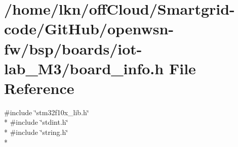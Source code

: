 \hypertarget{iot-lab___m3_2board__info_8h}{}\section{/home/lkn/off\+Cloud/\+Smartgrid-\/code/\+Git\+Hub/openwsn-\/fw/bsp/boards/iot-\/lab\+\_\+\+M3/board\+\_\+info.h File Reference}
\label{iot-lab___m3_2board__info_8h}
{\ttfamily \#include \char`\"{}stm32f10x\+\_\+lib.\+h\char`\"{}}\\*
{\ttfamily \#include \char`\"{}stdint.\+h\char`\"{}}\\*
{\ttfamily \#include \char`\"{}string.\+h\char`\"{}}\\*
